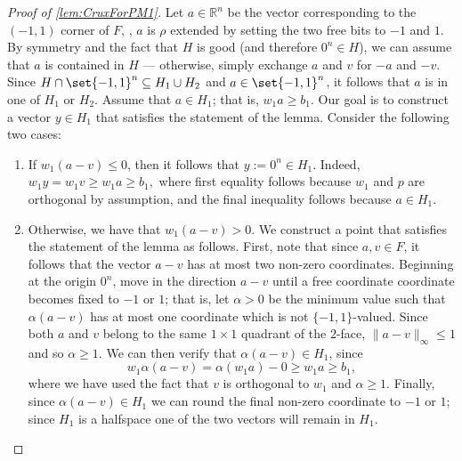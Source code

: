 \documentclass{toc}
\begin{document}
\begin{proof}[Proof of \autoref{lem:CruxForPM1}]
	Let $a \in \mathbb{R}^n$ be the vector corresponding to the $(-1,1)$ corner of $F$, \ie,  $a$ is $\rho$ extended by setting the two free bits to $-1$ and $1$. By symmetry and the fact that $H$ is good (and therefore $0^n \in H$), we can assume that $a$ is contained in $H$ --- otherwise, simply exchange $a$ and $v$ for $-a$ and $-v$.
	Since $H \cap \set{-1, 1}^n \subseteq H_1 \cup H_2$ and $a \in \set{-1,1}^n$, it follows that $a$ is in one of $H_1$ or $H_2$.  
	Assume that $a \in H_1$; that is, $w_1a \geq b_1$.
	Our goal is to construct a vector $y \in H_1$ that satisfies the statement of the lemma. Consider the following two cases:
	\begin{enumerate}
		\item[(i)] If $w_1( a-v) \leq 0$, then it follows that  $y := 0^n \in H_1$. Indeed,
	$w_1 y = w_1v \geq w_1 a \geq b_1,$
	where first equality follows because $w_1$ and $p$ are orthogonal by assumption, and the final inequality follows because $a \in H_1$. 
		\item[(ii)] Otherwise, we have that $w_1(a-v) > 0$. 
			We construct a point that satisfies the statement of the lemma as follows.
			First, note that since $a, v \in F$, it follows that the vector $a - v$ has at most two non-zero coordinates.
			Beginning at the origin $0^n$, move in the direction $a-v$ until a free coordinate coordinate becomes fixed to $-1$ or $1$; that is, let $\alpha>0$ be the minimum value such that $\alpha(a-v)$ has at most one coordinate which is not $\{-1,1\}$-valued.
			Since both $a$ and $v$ belong to the same $1 \times 1$ quadrant of the $2$-face, $\|a-v\|_{\infty} \leq 1$ and so $\alpha \geq 1$.
			We can then verify that $\alpha(a-v) \in H_1$, since
			\[w_1 \alpha(a-v) = \alpha(w_1a) - 0 \geq w_1a \geq b_1,\]
			where we have used the fact that $v$ is orthogonal to $w_1$ and $\alpha \geq 1$.	
			Finally, since $\alpha(a - v) \in H_1$ we can round the final non-zero coordinate to $-1$ or $1$; since $H_1$ is a halfspace one of the two vectors will remain in $H_1$.    \qedhere  %
	\end{enumerate}
%
\end{proof}
\end{document}
